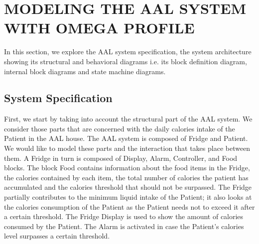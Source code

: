 \documentclass[a4paper,twoside]{article}
\begin{document}

\section{\uppercase{Modeling the AAL system with OMEGA Profile}}
\label{modeling aal system}
In this section, we explore the AAL system specification, the system architecture showing its structural and behavioral diagrams i.e. its block definition diagram, internal block diagrams and state machine diagrams.


\subsection{System Specification}
First, we start by taking into account the structural part of the AAL system. We consider those parts that are concerned with the daily calories intake of the Patient in the AAL house. The AAL system is composed of Fridge and Patient. We would like to model these parts and the interaction that takes place between them. A Fridge in turn is composed of Display, Alarm, Controller, and Food blocks. The block Food contains information about the food items in the Fridge, the calories contained by each item, the total number of calories the patient has accumulated and the calories threshold that should not be surpassed. The Fridge partially contributes to the minimum liquid intake of the Patient; it also looks at the calories consumption of the Patient as the Patient needs not to exceed it after a certain threshold. The Fridge Display is used to show the amount of calories consumed by the Patient. The Alarm is activated in case the Patient's calories level surpasses a certain threshold. 
\end{document}
